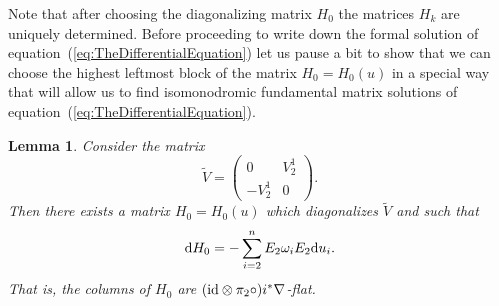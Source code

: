 \documentclass[pdftex]{sigma}
\numberwithin{equation}{section}
\newtheorem{Lemma}[Theorem]{Lemma}
\begin{document}
 Note that after choosing the diagonalizing matrix $H_{0}$ the matrices $H_{k}$ are uniquely determined. Before proceeding to write down the formal solution of equation~(\ref{eq:TheDifferentialEquation}) let us pause a bit to show that we can choose the highest leftmost block of the matrix $H_{0}=H_{0}(u)$ in a special way that will allow us to find isomonodromic fundamental matrix solutions of equation~(\ref{eq:TheDifferentialEquation}).
 \begin{Lemma}
 \label{lem:DiagonalizingV}
 Consider the matrix
 \begin{equation*}
 \tilde{V}=\begin{pmatrix}
 0 & V^{1}_{2}\\
 -V^{1}_{2}&0
 \end{pmatrix}.
 \end{equation*}
 Then there exists a matrix $H_{0}=H_{0}(u)$ which diagonalizes $\tilde{V}$ and such that
 \begin{equation*}
 {\rm d}H_{0}=-\sum_{i=2}^{n}E_{2}\omega_{i}E_{2}{\rm d}u_{i}.
 \end{equation*}
 That is, the columns of $H_{0}$ are $({\rm id}\otimes\pi_{2}\circ)i^{*}\nabla$-flat.
 \end{Lemma}
\end{document}
